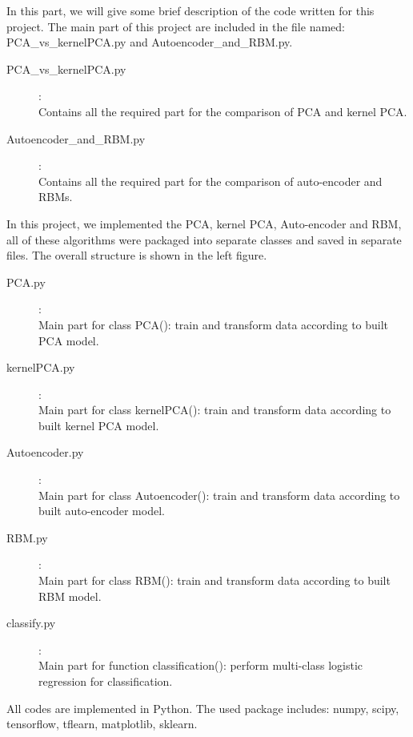 \documentclass[tikz, multi,dvipsnames,svgnames,x11names]{article}
\begin{document}
In this part, we will give some brief description of the code written for this project. The main part of this project are included in the file named: PCA\_vs\_kernelPCA.py and Autoencoder\_and\_RBM.py.

\begin{description}
\item[PCA\_vs\_kernelPCA.py]:\\
	Contains all the required part for the comparison of PCA and kernel PCA.
\item[Autoencoder\_and\_RBM.py]:\\
	Contains all the required part for the comparison of auto-encoder and RBMs.
\end{description}

In this project, we implemented the PCA, kernel PCA, Auto-encoder and RBM, all of these algorithms were packaged into separate classes and saved in separate files. The overall structure is shown in the left figure.

\begin{description}
\item[PCA.py]:\\
	Main part for class PCA(): train and transform data according to built PCA model.
\item[kernelPCA.py]:\\
	Main part for class kernelPCA(): train and transform data according to built kernel PCA model.
\item[Autoencoder.py]:\\
	Main part for class Autoencoder(): train and transform data according to built auto-encoder model.
\item[RBM.py]:\\
	Main part for class RBM(): train and transform data according to built RBM model.
\item[classify.py]:\\
	Main part for function classification(): perform multi-class logistic regression for classification.
\end{description}

All codes are implemented in Python. The used package includes: numpy, scipy, tensorflow, tflearn, matplotlib, sklearn.
\end{document}
